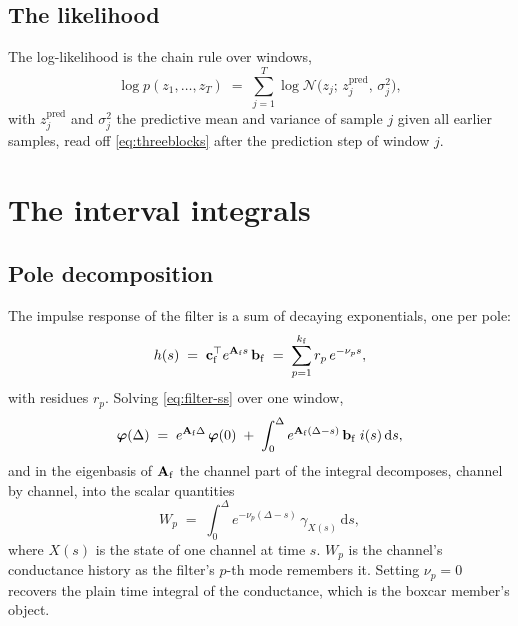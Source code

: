 \documentclass[11pt]{article}
\begin{document}
\subsection{The likelihood}

The log-likelihood is the chain rule over windows,
\begin{equation}
  \log p(z_1,\dots,z_T)
  \;=\;
  \sum_{j=1}^{T} \log \mathcal{N}\!\bigl(z_j;\,
    z^{\mathrm{pred}}_j,\, \sigma^2_j\bigr),
  \label{eq:lik}
\end{equation}
with $z^{\mathrm{pred}}_j$ and $\sigma^2_j$ the predictive mean and
variance of sample $j$ given all earlier samples, read off
\eqref{eq:threeblocks} after the prediction step of window $j$.

\section{The interval integrals}
\label{sec:integrals}

\subsection{Pole decomposition}

The impulse response of the filter is a sum of decaying exponentials, one
per pole:
\begin{equation}
  h(s) \;=\; \mathbf{c}_{\mathrm{f}}^{\top} e^{\mathbf{A}_{\mathrm{f}} s}\, \mathbf{b}_{\mathrm{f}}
  \;=\; \sum_{p=1}^{k_{\mathrm{f}}} r_p\, e^{-\nu_p s},
  \label{eq:impulse}
\end{equation}
with residues $r_p$. Solving \eqref{eq:filter-ss} over one window,
\begin{equation}
  \bm{\varphi}(\Delta)
  \;=\;
  e^{\mathbf{A}_{\mathrm{f}}\Delta}\,\bm{\varphi}(0)
  \;+\;
  \int_0^{\Delta} e^{\mathbf{A}_{\mathrm{f}}(\Delta-s)}\,\mathbf{b}_{\mathrm{f}}\; i(s)\,\mathrm{d}s ,
  \label{eq:filter-sol}
\end{equation}
and in the eigenbasis of $\mathbf{A}_{\mathrm{f}}$ the channel part of the integral
decomposes, channel by channel, into the scalar quantities
\begin{equation}
  W_p \;=\; \int_0^{\Delta} e^{-\nu_p(\Delta-s)}\,
  \gamma_{X(s)}\,\mathrm{d}s ,
  \label{eq:Wp}
\end{equation}
where $X(s)$ is the state of one channel at time $s$. $W_p$ is the
channel's conductance history as the filter's $p$-th mode remembers it.
Setting $\nu_p = 0$ recovers the plain time integral of the conductance,
which is the boxcar member's object.
\end{document}
